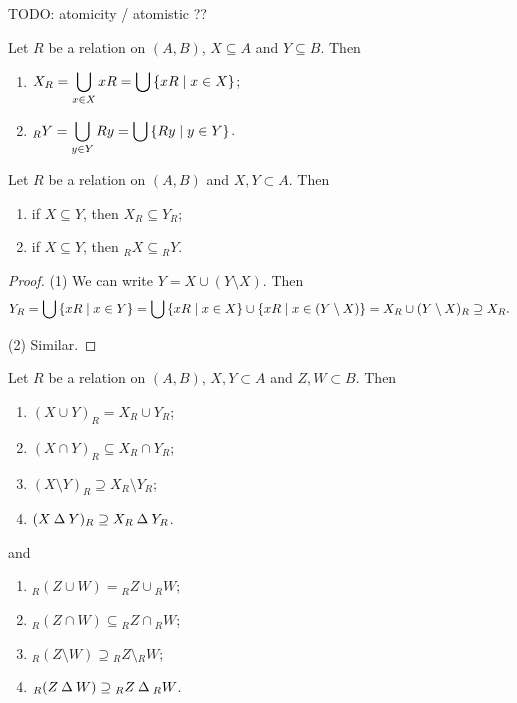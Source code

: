 TODO: atomicity / atomistic ??
\begin{lemma} \label{imagesFromPrincipalImages}
Let $R$ be a relation on $(A, B)$, $X\subseteq A$ and $Y\subseteq B$. Then
\begin{enumerate}
\item $X_R = \displaystyle\bigcup_{x\in X}xR = \bigcup \setbuilder{xR}{x\in X}$;
\item $_RY = \displaystyle\bigcup_{y\in Y}Ry = \bigcup \setbuilder{Ry}{y\in Y}$.
\end{enumerate}
\end{lemma}


\begin{corollary} \label{monotonicityImage}
Let $R$ be a relation on $(A, B)$ and $X,Y\subset A$. Then
\begin{enumerate}
\item if $X\subseteq Y$, then $X_R \subseteq Y_R$;
\item if $X\subseteq Y$, then ${_RX} \subseteq {_RY}$.
\end{enumerate}
\end{corollary}
\begin{proof}
(1) We can write $Y = X \cup (Y\setminus X)$. Then
\[ Y_R = \bigcup \setbuilder{xR}{x\in Y} = \bigcup \setbuilder{xR}{x\in X}\cup\setbuilder{xR}{x\in (Y\setminus X)} = X_R \cup (Y\setminus X)_R \supseteq X_R. \]

(2) Similar.
\end{proof}
\begin{corollary} \label{imageRelation} \label{preimageRelation}
Let $R$ be a relation on $(A, B)$, $X,Y\subset A$ and $Z,W\subset B$. Then
\begin{enumerate}
\item $(X\cup Y)_R = X_R\cup Y_R$;
\item $(X\cap Y)_R \subseteq X_R\cap Y_R$;
\item $(X\setminus Y)_R \supseteq X_R\setminus Y_R$;
\item $(X\mathbin{\Delta} Y)_R \supseteq X_R\mathbin{\Delta} Y_R$.
\end{enumerate}
and
\begin{enumerate}
\item $_R(Z\cup W) = {_RZ}\cup {_RW}$;
\item $_R(Z\cap W) \subseteq {_RZ}\cap {_RW}$;
\item $_R(Z\setminus W) \supseteq {_RZ}\setminus {_RW}$;
\item $_R(Z\mathbin{\Delta} W) \supseteq {_RZ}\mathbin{\Delta} {_RW}$.
\end{enumerate}
\end{corollary}
